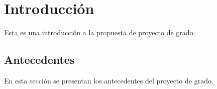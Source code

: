\section{Introducción}
Esta es una introducción a la propuesta de proyecto de grado.

\subsection{Antecedentes}
En esta sección se presentan los antecedentes del proyecto de grado.
